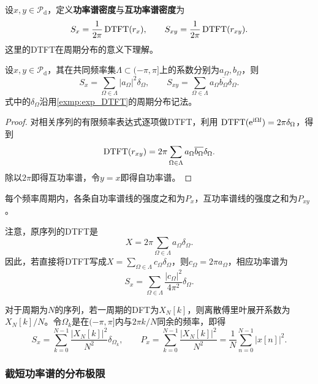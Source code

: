 \begin{definition}[离散信号的功率谱密度]
    设$x,y\in\mathcal{P}_{\mathrm d}$，定义\textbf{功率谱密度}与\textbf{互功率谱密度}为
    $$
        S_x=\frac1{2\pi}\operatorname{DTFT}(r_x),
        \qquad
        S_{xy}=\frac1{2\pi}\operatorname{DTFT}(r_{xy}).
    $$
    这里的DTFT在周期分布的意义下理解。
\end{definition}

\begin{theorem}[有限频率序列的功率谱]\label{thm:discrete_PSD}
    设$x,y\in\mathcal{P}_{\mathrm d}$，其在共同频率集$\Lambda\subset(-\pi,\pi]$上的系数分别为$a_\Omega,b_\Omega$，则
    $$
        S_x=\sum_{\Omega\in\Lambda}|a_\Omega|^2\delta_\Omega,
        \qquad
        S_{xy}=\sum_{\Omega\in\Lambda}
        a_\Omega\overline{b_\Omega}\delta_\Omega.
    $$
    式中的$\delta_\Omega$沿用\cref{exmp:exp_DTFT}的周期分布记法。
\end{theorem}
\begin{proof}
    对相关序列的有限频率表达式逐项做DTFT，利用
    $\operatorname{DTFT}(\mathrm{e}^{\mathrm{i}\Omega l})=2\pi\delta_\Omega$，得到
    $$
        \operatorname{DTFT}(r_{xy})=2\pi\sum_{\Omega\in\Lambda}
        a_\Omega\overline{b_\Omega}\delta_\Omega.
    $$
    除以$2\pi$即得互功率谱，令$y=x$即得自功率谱。
\end{proof}

每个频率周期内，各条自功率谱线的强度之和为$P_x$，互功率谱线的强度之和为$P_{xy}$。

注意，原序列的DTFT是
$$
    X=2\pi\sum_{\Omega\in\Lambda}a_\Omega\delta_\Omega.
$$
因此，若直接将DTFT写成$X=\sum_{\Omega\in\Lambda}c_\Omega\delta_\Omega$，则$c_\Omega=2\pi a_\Omega$，相应功率谱为
$$
    S_x=\sum_{\Omega\in\Lambda}\frac{|c_\Omega|^2}{4\pi^2}\delta_\Omega.
$$

对于周期为$N$的序列，若一周期的DFT为$X_N[k]$，则离散傅里叶展开系数为$X_N[k]/N$。令$\Omega_k$是在$(-\pi,\pi]$内与$2\pi k/N$同余的频率，即得
$$
    S_x=\sum_{k=0}^{N-1}\frac{|X_N[k]|^2}{N^2}\delta_{\Omega_k},
    \qquad
    P_x=\sum_{k=0}^{N-1}\frac{|X_N[k]|^2}{N^2}
    =\frac1N\sum_{n=0}^{N-1}|x[n]|^2.
$$

\subsubsection{截短功率谱的分布极限}

